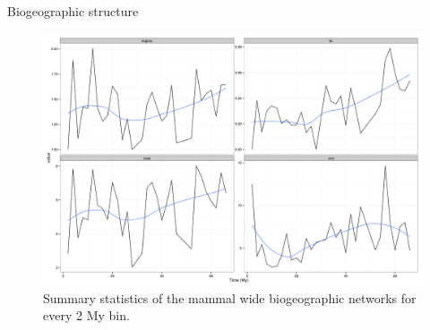 \documentclass[final]{beamer}\usepackage[]{graphicx}\usepackage[]{color}
\newlength{\onecolwid}
\newlength{\twocolwid}
\begin{document}
\begin{frame}[t]
\begin{columns}[t]
\begin{column}{\twocolwid}
\begin{columns}[t,totalwidth = \twocolwid]
        \begin{column}{\onecolwid}
          \begin{block}{Biogeographic structure}
            \begin{figure}[ht]
              \begin{center}
                \includegraphics[height = 0.2\textheight]{figure/gen_bin}
              \end{center}
              \caption{Summary statistics of the mammal wide biogeographic networks for every 2 My bin.}
              \label{fig:net_gen}
            \end{figure}
          \end{block}
        \end{column}
      \end{columns}


\end{column}
\end{columns}
\end{frame}
\end{document}
